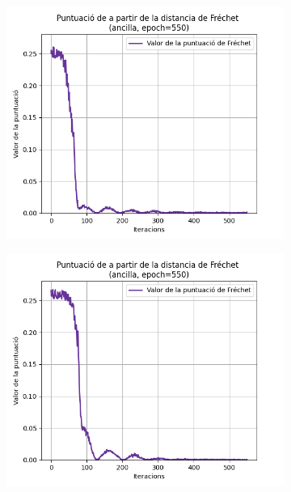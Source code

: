 \begin{figure}
	\begin{subfigure}[b]{.32\linewidth}
		\includegraphics[width=\linewidth]{figures/data/FD_score_A1.png}
		\caption{}
	\end{subfigure}
	\begin{subfigure}[b]{.32\linewidth}
		\includegraphics[width=\linewidth]{figures/data/FD_score_A2.png}
		\caption{}
	\end{subfigure}
	\begin{subfigure}[b]{.32\linewidth}

\end{subfigure}
\end{figure}

